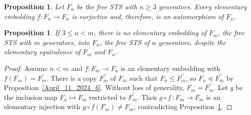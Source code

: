 \documentclass[10pt,a4paper]{article}
\theoremstyle{note}
\newtheorem{prop}[thm]{Proposition}
\begin{document}
	\begin{prop}\label{April_11_2024_5} Let $F_n$ be the free STS with $n\geq 3$ generators. Every elementary embedding $f:F_n\rightarrow F_n$ is surjective and, therefore, is an automorphism of $F_n$.
	\end{prop}

	\begin{prop}\label{April_11_2024_7} If $3\leq n<m$, there is no elementary embedding of $F_m$, the free STS with $m$ generators, into $F_n$, the free STS of $n$ generators, despite the elementary equivalence of $F_m$ and $F_n$.
	\end{prop}

	\begin{proof} Assume $n<m$ and $f:F_m\rightarrow F_n$ is an elementary embedding  with $f(F_m)=F_m^\prime$. There is a copy $F_m^{\prime \prime}$ of $F_m$ such that $F_n \leq F_m^{\prime \prime}$, so $F_n\preccurlyeq F_m^{\prime \prime}$ by Proposition~\ref{April_11_2024_6}. Without loss of generality, $F_m=F_m^{\prime \prime}$. Let $g$ be the inclusion map $F_n \mapsto F_m$ restricted to $F_m^\prime$. Then $ g \circ f\, : F_m \to F_m$ is an elementary injection with $g \circ f(F_m)\neq F_m$, contradicting Proposition~\ref{April_11_2024_5}.
	
	\end{proof}
\end{document}

